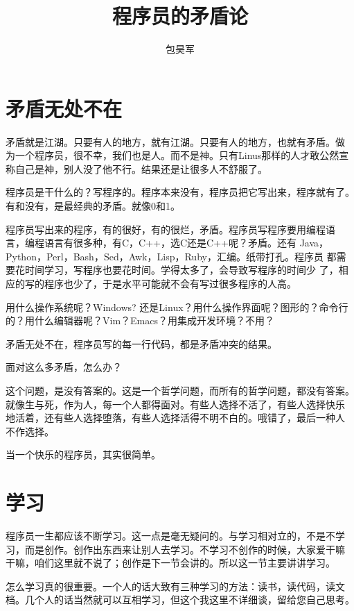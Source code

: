 \documentclass[10pt]{article}
\begin{document}
\begin{CJK*}{UTF8}{simhei}
\CJKtilde

\title{程序员的矛盾论}
\date{}
\author{包昊军}
\maketitle

\section{矛盾无处不在}

矛盾就是江湖。只要有人的地方，就有江湖。只要有人的地方，也就有矛盾。做
为一个程序员，很不幸，我们也是人。而不是神。只有Linus那样的人才敢公然宣
称自己是神，别人没了他不行。结果还是让很多人不舒服了。

程序员是干什么的？写程序的。程序本来没有，程序员把它写出来，程序就有了。
有和没有，是最经典的矛盾。就像0和1。

程序员写出来的程序，有的很好，有的很烂，矛盾。程序员写程序要用编程语
言，编程语言有很多种，有C，C++，选C还是C++呢？矛盾。还有
Java，Python，Perl，Bash，Sed，Awk，Lisp，Ruby，汇编。纸带打孔。程序员
都需要花时间学习，写程序也要花时间。学得太多了，会导致写程序的时间少
了，相应的写的程序也少了，于是水平可能就不会有写过很多程序的人高。

用什么操作系统呢？Windows? 还是Linux？用什么操作界面呢？图形的？命令行
的？用什么编辑器呢？Vim？Emacs？用集成开发环境？不用？

矛盾无处不在，程序员写的每一行代码，都是矛盾冲突的结果。

面对这么多矛盾，怎么办？

这个问题，是没有答案的。这是一个哲学问题，而所有的哲学问题，都没有答案。
就像生与死，作为人，每一个人都得面对。有些人选择不活了，有些人选择快乐
地活着，还有些人选择堕落，有些人选择活得不明不白的。哦错了，最后一种人
不作选择。

当一个快乐的程序员，其实很简单。

\section{学习}

程序员一生都应该不断学习。这一点是毫无疑问的。与学习相对立的，不是不学
习，而是创作。创作出东西来让别人去学习。不学习不创作的时候，大家爱干嘛
干嘛，咱们这里就不说了；创作是下一节会讲的。所以这一节主要讲讲学习。

怎么学习真的很重要。一个人的话大致有三种学习的方法：读书，读代码，读文
档。几个人的话当然就可以互相学习，但这个我这里不详细谈，留给您自己思考。


\end{CJK*}
\end{document}
